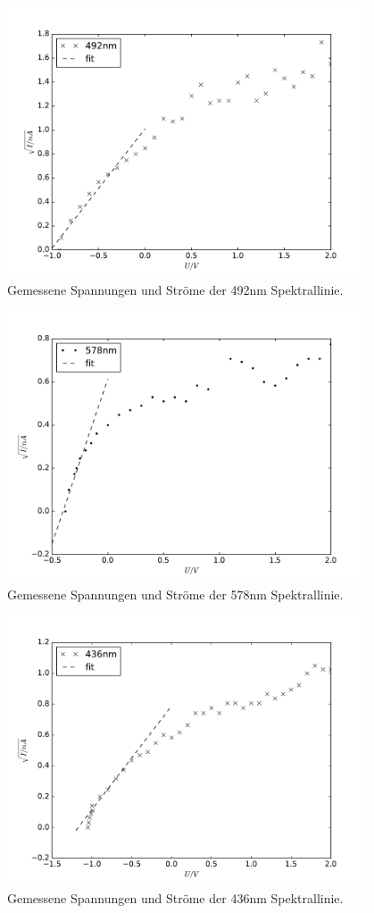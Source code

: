 \begin{figure}
  \centering
  \includegraphics[height = 8cm]{./plots/blau.pdf}
  \caption{Gemessene Spannungen und Ströme der 492nm Spektrallinie.}
  \label{fig:blau}
\end{figure}
\begin{figure}
  \centering
  \includegraphics[height = 8cm]{./plots/Orange.pdf}
  \caption{Gemessene Spannungen und Ströme der 578nm Spektrallinie.}
  \label{fig:orange}
\end{figure}
\begin{figure}
  \centering
  \includegraphics[height = 8cm]{./plots/blau2.pdf}
  \caption{Gemessene Spannungen und Ströme der 436nm Spektrallinie.}
  \label{fig:blau2}
\end{figure}
